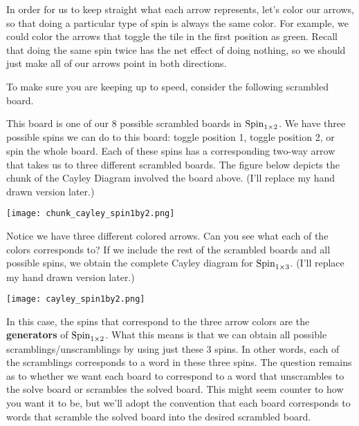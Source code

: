 In order for us to keep straight what each arrow represents, let's color our arrows, so that doing a particular type of spin is always the same color.  For example, we could color the arrows that toggle the tile in the first position as green.  Recall that doing the same spin twice has the net effect of doing nothing, so we should just make all of our arrows point in both directions.

To make sure you are keeping up to speed, consider the following scrambled board.

\begin{center}
\end{center}

This board is one of our 8 possible scrambled boards in \(\operatorname{Spin}_{1\times 2}\).  We have three possible spins we can do to this board: toggle position 1, toggle position 2, or spin the whole board.  Each of these spins has a corresponding two-way arrow that takes us to three different scrambled boards.  The figure below depicts the chunk of the Cayley Diagram involved the board above.  (I'll replace my hand drawn version later.)

\begin{center}
\texttt{[image: chunk\_cayley\_spin1by2.png]}
\end{center}

\noindent Notice we have three different colored arrows.  Can you see what each of the colors corresponds to?  If we include the rest of the scrambled boards and all possible spins, we obtain the complete Cayley diagram for \(\operatorname{Spin}_{1\times 3}\).  (I'll replace my hand drawn version later.)

\begin{center}
\texttt{[image: cayley\_spin1by2.png]}
\end{center}

\noindent In this case, the spins that correspond to the three arrow colors are the \textbf{generators} of \(\operatorname{Spin}_{1\times 2}\).  What this means is that we can obtain all possible scramblings/unscramblings by using just these 3 spins.  In other words, each of the scramblings corresponds to a word in these three spins.  The question remains as to whether we want each board to correspond to a word that unscrambles to the solve board or scrambles the solved board.  This might seem counter to how you want it to be, but we'll adopt the convention that each board corresponds to words that scramble the solved board into the desired scrambled board.

